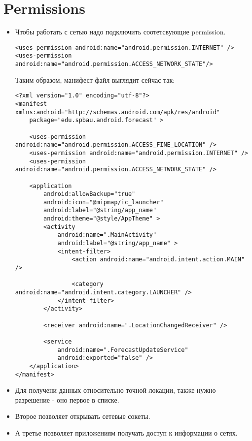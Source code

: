 \documentclass[12 pt]{article}
\begin{document}
\section{Permissions}
    \begin{itemize}
        \item Чтобы работать с сетью надо подключить соотетсвующие permission.
        \begin{lstlisting}
<uses-permission android:name="android.permission.INTERNET" /> 
<uses-permission  android:name="android.permission.ACCESS_NETWORK_STATE"/>        
        \end{lstlisting}
        
        Таким образом, манифест-файл выглядит сейчас так:
        \begin{lstlisting}
<?xml version="1.0" encoding="utf-8"?>
<manifest xmlns:android="http://schemas.android.com/apk/res/android"
    package="edu.spbau.android.forecast" >

    <uses-permission android:name="android.permission.ACCESS_FINE_LOCATION" />
    <uses-permission android:name="android.permission.INTERNET" />
    <uses-permission android:name="android.permission.ACCESS_NETWORK_STATE" />

    <application
        android:allowBackup="true"
        android:icon="@mipmap/ic_launcher"
        android:label="@string/app_name"
        android:theme="@style/AppTheme" >
        <activity
            android:name=".MainActivity"
            android:label="@string/app_name" >
            <intent-filter>
                <action android:name="android.intent.action.MAIN" />

                <category android:name="android.intent.category.LAUNCHER" />
            </intent-filter>
        </activity>

        <receiver android:name=".LocationChangedReceiver" />

        <service
            android:name=".ForecastUpdateService"
            android:exported="false" />
    </application>
</manifest>        
        \end{lstlisting}
        \item Для получени данных относительно точной локации, также нужно разрешение - оно первое в списке.
        \item Второе позволяет открывать сетевые сокеты.
        \item А третье позволяет приложениям получать доступ к информации о сетях.
    \end{itemize}
    
\end{document}
